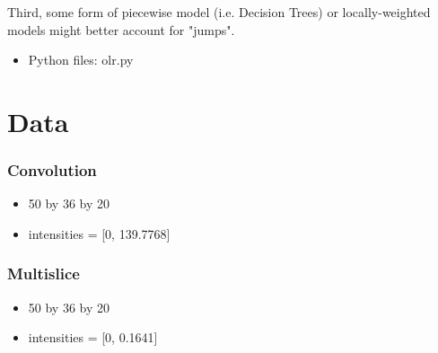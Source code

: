 \documentclass[11pt]{article}
\begin{document}
Third, some form of piecewise model (i.e. Decision Trees) or
locally-weighted models might better account for "jumps".

\begin{itemize}
\item Python files: olr.py
\end{itemize}
\section{Data}
\label{sec-2}
\subsubsection{Convolution}
\label{sec-2-0-1}
\begin{itemize}
\item 50 by 36 by 20
\item intensities = [0, 139.7768]
\end{itemize}

\subsubsection{Multislice}
\label{sec-2-0-2}
\begin{itemize}
\item 50 by 36 by 20
\item intensities = [0, 0.1641]
\end{itemize}
\end{document}
